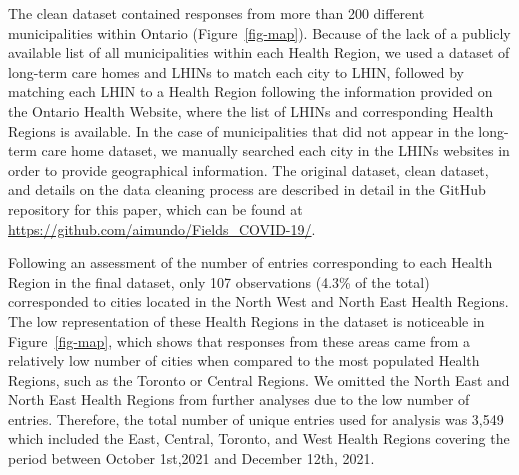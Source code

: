 \documentclass[
  letterpaper,
  DIV=11,
  numbers=noendperiod]{scrartcl}
\begin{document}
The clean dataset contained responses from more than 200 different
municipalities within Ontario (Figure~\ref{fig-map}). Because of the
lack of a publicly available list of all municipalities within each
Health Region, we used a dataset of long-term care homes and LHINs to
match each city to LHIN, followed by matching each LHIN to a Health
Region following the information provided on the Ontario Health Website,
where the list of LHINs and corresponding Health Regions is available.
In the case of municipalities that did not appear in the long-term care
home dataset, we manually searched each city in the LHINs websites in
order to provide geographical information. The original dataset, clean
dataset, and details on the data cleaning process are described in
detail in the GitHub repository for this paper, which can be found at
\url{https://github.com/aimundo/Fields_COVID-19/}.

Following an assessment of the number of entries corresponding to each
Health Region in the final dataset, only 107 observations (4.3\% of the
total) corresponded to cities located in the North West and North East
Health Regions. The low representation of these Health Regions in the
dataset is noticeable in Figure~\ref{fig-map}, which shows that
responses from these areas came from a relatively low number of cities
when compared to the most populated Health Regions, such as the Toronto
or Central Regions. We omitted the North East and North East Health
Regions from further analyses due to the low number of entries.
Therefore, the total number of unique entries used for analysis was
3,549 which included the East, Central, Toronto, and West Health Regions
covering the period between October 1st,2021 and December 12th, 2021.
\end{document}
